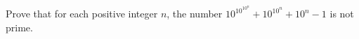 Prove that for each positive integer $n$, the number $10^{10^{10^n}}+10^{10^n}+10^n-1$ is not prime.